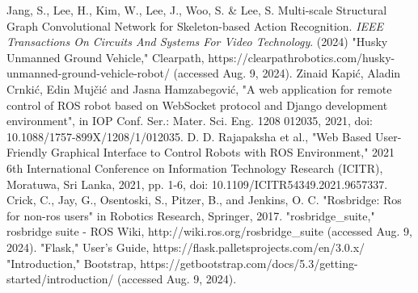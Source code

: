 \documentclass[letterpaper, 10 pt, conference]{ieeeconf}  %
\begin{document}
\begin{thebibliography}{99}
Jang, S., Lee, H., Kim, W., Lee, J., Woo, S. \& Lee, S. Multi-scale Structural Graph Convolutional Network for Skeleton-based Action Recognition. {\em IEEE Transactions On Circuits And Systems For Video Technology}. (2024)
"Husky Unmanned Ground Vehicle," Clearpath, https://clearpathrobotics.com/husky-unmanned-ground-vehicle-robot/ (accessed Aug. 9, 2024).
 Zinaid Kapić, Aladin Crnkić, Edin Mujčić and Jasna Hamzabegović, "A web application for remote control of ROS robot based on WebSocket protocol and Django development environment", in IOP Conf. Ser.: Mater. Sci. Eng. 1208 012035, 2021, doi: 10.1088/1757-899X/1208/1/012035.
 D. D. Rajapaksha et al., "Web Based User-Friendly Graphical Interface to Control Robots with ROS Environment," 2021 6th International Conference on Information Technology Research (ICITR), Moratuwa, Sri Lanka, 2021, pp. 1-6, doi: 10.1109/ICITR54349.2021.9657337.
 Crick, C., Jay, G., Osentoski, S., Pitzer, B., and Jenkins, O. C. "Rosbridge: Ros for non-ros users" in Robotics Research, Springer, 2017.
"rosbridge\_suite," rosbridge suite - ROS Wiki, http://wiki.ros.org/rosbridge\_suite (accessed Aug. 9, 2024).
"Flask," User’s Guide, https://flask.palletsprojects.com/en/3.0.x/
"Introduction," Bootstrap, https://getbootstrap.com/docs/5.3/getting-started/introduction/ (accessed Aug. 9, 2024).






\end{thebibliography}
\end{document}
